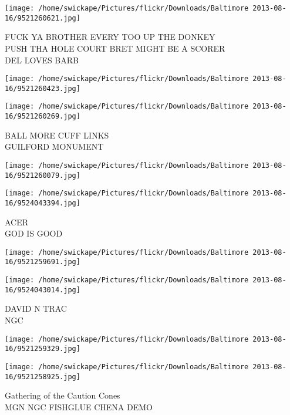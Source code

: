 \documentclass[10pt,letterpaper]{article}
\begin{document}
\texttt{[image: /home/swickape/Pictures/flickr/Downloads/Baltimore 2013-08-16/9521260621.jpg]}

FUCK YA BROTHER EVERY TOO UP THE DONKEY\\
PUSH THA HOLE COURT BRET MIGHT BE A SCORER\\
DEL LOVES BARB\\
\pagebreak

\texttt{[image: /home/swickape/Pictures/flickr/Downloads/Baltimore 2013-08-16/9521260423.jpg]}

\vspace{0.25in}
\texttt{[image: /home/swickape/Pictures/flickr/Downloads/Baltimore 2013-08-16/9521260269.jpg]}

BALL MORE CUFF LINKS\\
GUILFORD MONUMENT\\
\pagebreak

\texttt{[image: /home/swickape/Pictures/flickr/Downloads/Baltimore 2013-08-16/9521260079.jpg]}

\vspace{0.25in}
\texttt{[image: /home/swickape/Pictures/flickr/Downloads/Baltimore 2013-08-16/9524043394.jpg]}

ACER\\
GOD IS GOOD\\
\pagebreak

\texttt{[image: /home/swickape/Pictures/flickr/Downloads/Baltimore 2013-08-16/9521259691.jpg]}

\vspace{0.25in}
\texttt{[image: /home/swickape/Pictures/flickr/Downloads/Baltimore 2013-08-16/9524043014.jpg]}

DAVID N TRAC\\
NGC\\
\pagebreak

\texttt{[image: /home/swickape/Pictures/flickr/Downloads/Baltimore 2013-08-16/9521259329.jpg]}

\vspace{0.25in}
\texttt{[image: /home/swickape/Pictures/flickr/Downloads/Baltimore 2013-08-16/9521258925.jpg]}

Gathering of the Caution Cones\\
MGN NGC FISHGLUE CHENA DEMO\\
\pagebreak
\end{document}
